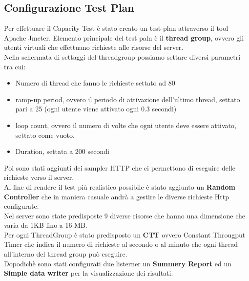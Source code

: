 \subsection{Configurazione Test Plan}
Per effettuare il Capacity Test è stato creato un test plan attraverso il tool Apache Jmeter.
Elemento principale del test paln è il \textbf{thread group}, ovvero gli utenti virtuali che effettuano richieste alle risorse del server.\\
Nella schermata di settaggi del threadgroup possiamo settare diversi parametri tra cui:
\begin{itemize}
    \item Numero di thread che fanno le richieste settato ad 80
    \item ramp-up period, ovvero il periodo di attivazione dell'ultimo thread, settato pari a 25 (ogni utente viene attivato ogni 0.3 secondi) 
    \item loop count, ovvero il numero di volte che ogni utente deve essere attivato, settato come vuoto.
    \item Duration, settata a 200 secondi
\end{itemize}
Poi sono stati aggiunti dei sampler HTTP che ci permettono di eseguire delle richieste verso il server.\\
Al fine di rendere il test più realistico possibile è stato aggiunto un \textbf{Random Controller} che in maniera casuale andrà a gestire le diverse richieste Http configurate.\\
Nel server sono state predisposte 9 diverse risorse che hanno una dimensione che varia da 1KB fino a 16 MB.\\
Per ogni ThreadGroup è stato predisposto un \textbf{CTT} ovvero Constant Througput Timer che indica il numero di richieste al secondo o al minuto che ogni thread all'interno del thread group può eseguire.\\
Dopodichè sono stati configurati due listerner un \textbf{Summery Report} ed un \textbf{Simple data writer} per la visualizzazione dei risultati.\\
